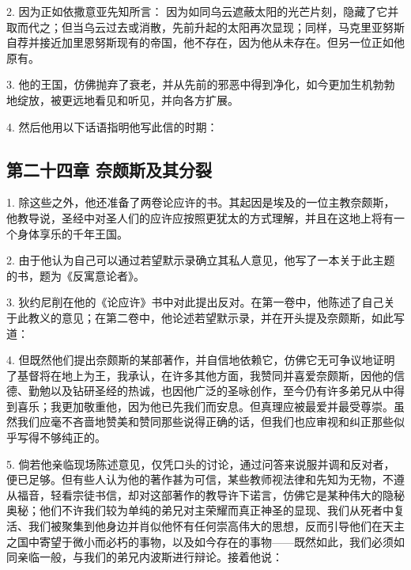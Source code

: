 2. 因为正如依撒意亚先知所言： 因为如同乌云遮蔽太阳的光芒片刻，隐藏了它并取而代之；但当乌云过去或消散，先前升起的太阳再次显现；同样，马克里亚努斯自荐并接近加里恩努斯现有的帝国，他不存在，因为他从未存在。但另一位正如他原有。\par

3. 他的王国，仿佛抛弃了衰老，并从先前的邪恶中得到净化，如今更加生机勃勃地绽放，被更远地看见和听见，并向各方扩展。\par

4. 然后他用以下话语指明他写此信的时期：\par

\par


\subsection{第二十四章 奈颇斯及其分裂}

1. 除这些之外，他还准备了两卷论应许的书。其起因是埃及的一位主教奈颇斯，他教导说，圣经中对圣人们的应许应按照更犹太的方式理解，并且在这地上将有一个身体享乐的千年王国。\par

2. 由于他认为自己可以通过若望默示录确立其私人意见，他写了一本关于此主题的书，题为《反寓意论者》。\par

3. 狄约尼削在他的《论应许》书中对此提出反对。在第一卷中，他陈述了自己关于此教义的意见；在第二卷中，他论述若望默示录，并在开头提及奈颇斯，如此写道：\par

4. 但既然他们提出奈颇斯的某部著作，并自信地依赖它，仿佛它无可争议地证明了基督将在地上为王，我承认，在许多其他方面，我赞同并喜爱奈颇斯，因他的信德、勤勉以及钻研圣经的热诚，也因他广泛的圣咏创作，至今仍有许多弟兄从中得到喜乐；我更加敬重他，因为他已先我们而安息。但真理应被最爱并最受尊崇。虽然我们应毫不吝啬地赞美和赞同那些说得正确的话，但我们也应审视和纠正那些似乎写得不够纯正的。\par

5. 倘若他亲临现场陈述意见，仅凭口头的讨论，通过问答来说服并调和反对者，便已足够。但有些人认为他的著作甚为可信，某些教师视法律和先知为无物，不遵从福音，轻看宗徒书信，却对这部著作的教导许下诺言，仿佛它是某种伟大的隐秘奥秘；他们不许我们较为单纯的弟兄对主荣耀而真正神圣的显现、我们从死者中复活、我们被聚集到他身边并肖似他怀有任何崇高伟大的思想，反而引导他们在天主之国中寄望于微小而必朽的事物，以及如今存在的事物——既然如此，我们必须如同亲临一般，与我们的弟兄内波斯进行辩论。接着他说：\par

